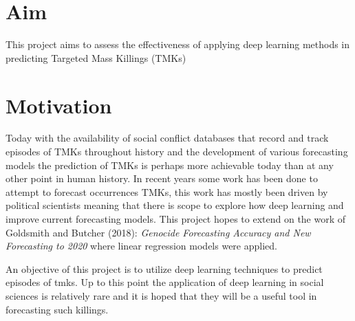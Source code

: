 \section{Aim}
This project aims to assess the effectiveness of applying deep learning methods in predicting Targeted Mass Killings (TMKs)\\

\section{Motivation}
Today with the availability of social conflict databases that record and track episodes of TMKs throughout history and the development of various forecasting models the prediction of TMKs is perhaps more achievable today than at any other point in human history. In recent years some work has been done to attempt to forecast occurrences TMKs, this work has mostly been driven by political scientists meaning that there is scope to explore how deep learning and improve current forecasting models. This project hopes to extend on the work of Goldsmith and Butcher (2018): \emph{Genocide Forecasting Accuracy and New Forecasting to 2020} where linear regression models were applied.

An objective of this project is to utilize deep learning techniques to predict episodes of tmks. Up to this point the application of deep learning in social sciences is relatively rare and it is hoped that they will be a useful tool in forecasting such killings.


